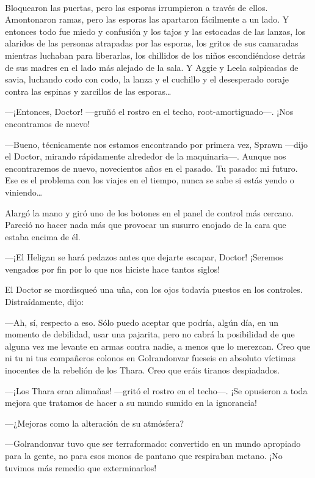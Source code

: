 ~

Bloquearon las puertas, pero las esporas irrumpieron a través de ellos.
Amontonaron ramas, pero las esporas las apartaron fácilmente a un lado.
Y entonces todo fue miedo y confusión y los tajos y las estocadas de las
lanzas, los alaridos de las personas atrapadas por las esporas, los
gritos de sus camaradas mientras luchaban para liberarlas, los chillidos
de los niños escondiéndose detrás de sus madres en el lado más alejado
de la sala. Y Aggie y Leela salpicadas de savia, luchando codo con codo,
la lanza y el cuchillo y el desesperado coraje contra las espinas y
zarcillos de las esporas\ldots{}

---¡Entonces, Doctor! ---gruñó el rostro en el techo,
root-amortiguado---. ¡Nos encontramos de nuevo!

---Bueno, técnicamente nos estamos encontrando por primera vez, Sprawn
---dijo el Doctor, mirando rápidamente alrededor de la maquinaria---.
Aunque nos encontraremos de nuevo, novecientos años en el pasado. Tu
pasado: mi futuro. Ese es el problema con los viajes en el tiempo, nunca
se sabe si estás yendo o viniendo\ldots{}

Alargó la mano y giró uno de los botones en el panel de control más
cercano. Pareció no hacer nada más que provocar un susurro enojado de la
cara que estaba encima de él.

---¡El Heligan se hará pedazos antes que dejarte escapar, Doctor!
¡Seremos vengados por fin por lo que nos hiciste hace tantos siglos!

El Doctor se mordisqueó una uña, con los ojos todavía puestos en los
controles. Distraídamente, dijo:

---Ah, sí, respecto a eso. Sólo puedo aceptar que podría, algún día, en
un momento de debilidad, usar una pajarita, pero no cabrá la posibilidad
de que alguna vez me levante en armas contra nadie, a menos que lo
merezcan. Creo que ni tu ni tus compañeros colonos en Golrandonvar
fueseis en absoluto víctimas inocentes de la rebelión de los Thara. Creo
que eráis tiranos despiadados.

---¡Los Thara eran alimañas! ---gritó el rostro en el techo---. ¡Se
opusieron a toda mejora que tratamos de hacer a su mundo sumido en la
ignorancia!

---¿Mejoras como la alteración de su atmósfera?

---Golrandonvar tuvo que ser terraformado: convertido en un mundo
apropiado para la gente, no para esos monos de pantano que respiraban
metano. ¡No tuvimos más remedio que exterminarlos!

